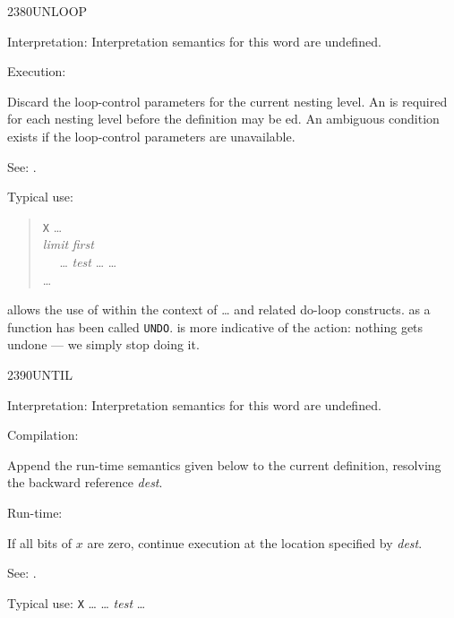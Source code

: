 \begin{newword*}{2380}{UNLOOP}
\item[Interpretation:]
	Interpretation semantics for this word are undefined.

\item[Execution:]
	\stack{}{}

	Discard the loop-control parameters for the current nesting
	level. An  is required for each nesting level
	before the definition may be ed. An ambiguous
	condition exists if the loop-control parameters are unavailable.

\item[See:]
	.

	\begin{rationale} %
		Typical use:
		\begin{quote}
			\word{:} \texttt{X} {\ldots} \\
			\tab \emph{limit} \emph{first}  \\
			\tab~~ {\ldots} \emph{test} 
				{\ldots}    {\ldots} \\
			\tab {} {\ldots} \\
			\word{;}
		\end{quote}

		 allows the use of  within the context
		of  {\ldots}  and related do-loop constructs.
		 as a function has been called \texttt{UNDO}.
		 is more indicative of the action: nothing gets
		undone --- we simply stop doing it.
	\end{rationale}
\end{newword*}


\begin{newword*}{2390}{UNTIL}
\item{Interpretation:}
	Interpretation semantics for this word are undefined.

\item[Compilation:]

	Append the run-time semantics given below to the current
	definition, resolving the backward reference \emph{dest}.

\item[Run-time:]

	If all bits of $x$ are zero, continue execution at the
	location specified by \emph{dest}.

\item[See:]
	.

	\begin{rationale} %
		Typical use:
			\word{:} \texttt{X} {\ldots}
				 {\ldots} \emph{test} 
			{\ldots} \word{;}
	\end{rationale}
\end{newword*}



